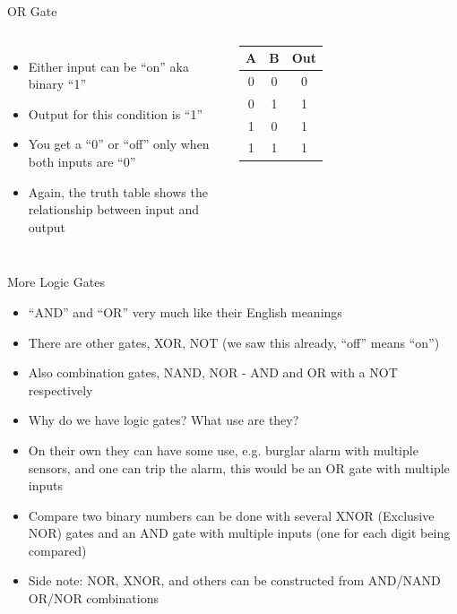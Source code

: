 \documentclass{beamer}
\begin{document}
\begin{frame}{OR Gate}
  \begin{columns}
    \begin{itemize}
    \item
      Either input can be ``on'' aka binary ``1''
    \item
      Output for this condition is ``1''
    \item
      You get a ``0'' or ``off'' only when both inputs are ``0''
    \item
      Again, the truth table shows the relationship between input and output
    \end{itemize}

    \begin{tabular}{ccc}
      \hline
      \textbf{A} & \textbf{B} & \textbf{Out} \\
      \hline
      0 & 0 & 0 \\
      0 & 1 & 1 \\
      1 & 0 & 1 \\
      1 & 1 & 1 \\
      \hline
    \end{tabular}    
  \end{columns}    
\end{frame}


\begin{frame}{More Logic Gates}
  \begin{itemize}
  \item
    ``AND'' and ``OR'' very much like their English meanings
  \item
    There are other gates, XOR, NOT (we saw this already, ``off'' means ``on'')
  \item
    Also combination gates, NAND, NOR - AND and OR with a NOT respectively
  \item
    Why do we have logic gates?  What use are they?
  \item
    On their own they can have some use, e.g. burglar alarm with multiple sensors, and one can trip the alarm, this would be an OR gate with multiple inputs
  \item
    Compare two binary numbers can be done with several XNOR (Exclusive NOR) gates and an AND gate with multiple inputs (one for each digit being compared)
  \item
    Side note: NOR, XNOR, and others can be constructed from AND/NAND OR/NOR combinations
  \end{itemize}
\end{frame}
\end{document}
